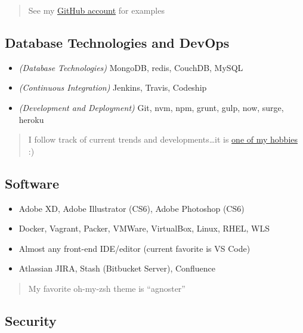 \documentclass[10pt]{article}
\def\tightlist{}
\begin{document}
\begin{quote}
See my \href{https://github.com/jhwohlgemuth}{GitHub account} for
examples
\end{quote}

\hypertarget{database-technologies-and-devops}{%
\subsection{Database Technologies and
DevOps}\label{database-technologies-and-devops}}

\begin{itemize}
\tightlist
\item
  \emph{(Database Technologies)} MongoDB, redis, CouchDB, MySQL
\item
  \emph{(Continuous Integration)} Jenkins, Travis, Codeship
\item
  \emph{(Development and Deployment)} Git, nvm, npm, grunt, gulp, now,
  surge, heroku
\end{itemize}

\begin{quote}
I follow track of current trends and developments\ldots it is
\href{https://twitter.com/jhwohlgemuth}{one of my hobbies} :)
\end{quote}

\hypertarget{software}{%
\subsection{Software}\label{software}}

\begin{itemize}
\tightlist
\item
  Adobe XD, Adobe Illustrator (CS6), Adobe Photoshop (CS6)
\item
  Docker, Vagrant, Packer, VMWare, VirtualBox, Linux, RHEL, WLS
\item
  Almost any front-end IDE/editor (current favorite is VS Code)
\item
  Atlassian JIRA, Stash (Bitbucket Server), Confluence
\end{itemize}

\begin{quote}
My favorite oh-my-zsh theme is ``agnoster''
\end{quote}

\hypertarget{security}{%
\subsection{Security}\label{security}}
\end{document}

